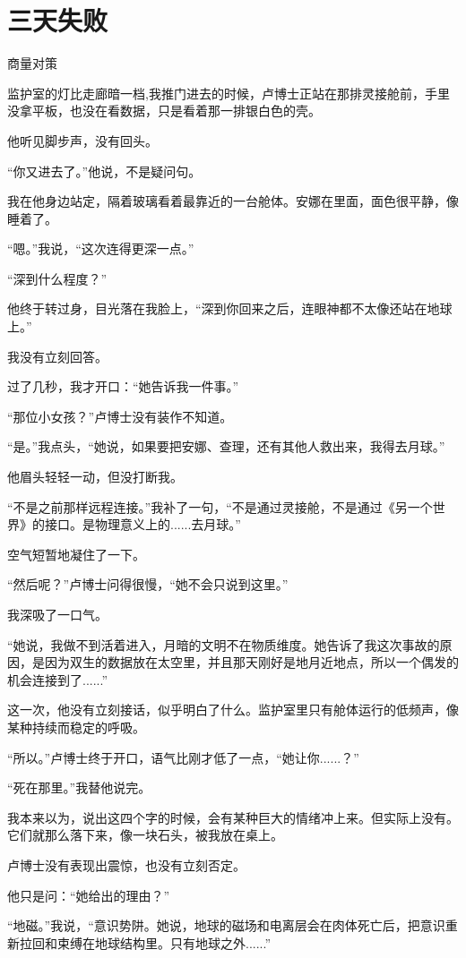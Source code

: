 \chapter{三天失败}

商量对策

监护室的灯比走廊暗一档,我推门进去的时候，卢博士正站在那排灵接舱前，手里没拿平板，也没在看数据，只是看着那一排银白色的壳。

他听见脚步声，没有回头。

“你又进去了。”他说，不是疑问句。

我在他身边站定，隔着玻璃看着最靠近的一台舱体。安娜在里面，面色很平静，像睡着了。

“嗯。”我说，“这次连得更深一点。”

“深到什么程度？”

他终于转过身，目光落在我脸上，“深到你回来之后，连眼神都不太像还站在地球上。”

我没有立刻回答。

过了几秒，我才开口：“她告诉我一件事。”

“那位小女孩？”卢博士没有装作不知道。

“是。”我点头，“她说，如果要把安娜、查理，还有其他人救出来，我得去月球。”

他眉头轻轻一动，但没打断我。

“不是之前那样远程连接。”我补了一句，“不是通过灵接舱，不是通过《另一个世界》的接口。是物理意义上的......去月球。”

空气短暂地凝住了一下。

“然后呢？”卢博士问得很慢，“她不会只说到这里。”

我深吸了一口气。

“她说，我做不到活着进入，月暗的文明不在物质维度。她告诉了我这次事故的原因，是因为双生的数据放在太空里，并且那天刚好是地月近地点，所以一个偶发的机会连接到了......”

这一次，他没有立刻接话，似乎明白了什么。监护室里只有舱体运行的低频声，像某种持续而稳定的呼吸。

“所以。”卢博士终于开口，语气比刚才低了一点，“她让你......？”

“死在那里。”我替他说完。

我本来以为，说出这四个字的时候，会有某种巨大的情绪冲上来。但实际上没有。它们就那么落下来，像一块石头，被我放在桌上。

卢博士没有表现出震惊，也没有立刻否定。

他只是问：“她给出的理由？”

“地磁。”我说，“意识势阱。她说，地球的磁场和电离层会在肉体死亡后，把意识重新拉回和束缚在地球结构里。只有地球之外......”

